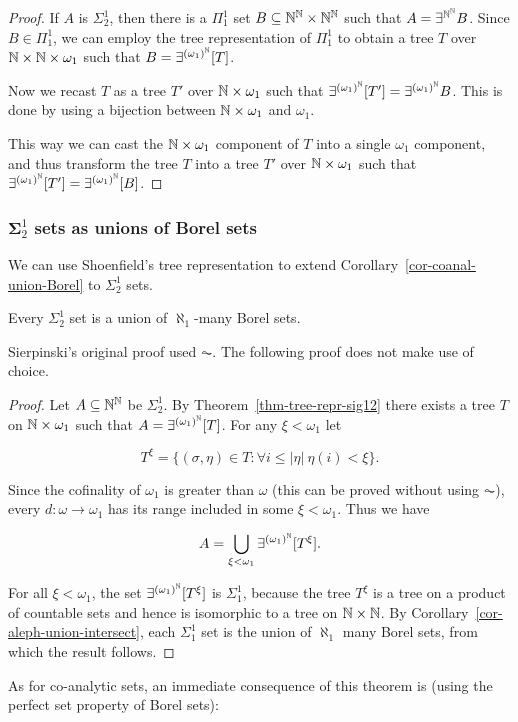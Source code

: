 \begin{proof}
If $A$ is $\Sigma^1_2$, then there is a $\Pi^1_1$ set $B \subseteq \mathbb{N}^{\mathbb{N}}\times\mathbb{N}^{\mathbb{N}}$  such that $A = \exists^{\mathbb{N}^{\mathbb{N}}} B$. Since $B \in \Pi^1_1$, we can employ the tree representation of $\Pi^1_1$ to obtain a tree $T$ over $\mathbb{N} \times \mathbb{N} \times \omega_1$ such that $B = \exists^{(\omega_1)^{\mathbb{N}}} [T]$.

Now we recast $T$ as a tree $T'$ over $\mathbb{N} \times \omega_1$ such that $\exists^{(\omega_1)^{\mathbb{N}}}[T'] = \exists^{(\omega_1)^{\mathbb{N}}} B$. This is done by using a bijection between $\mathbb{N} \times \omega_1$ and $\omega_1$.

This way we can cast the $\mathbb{N} \times \omega_1$ component of $T$ into a single $\omega_1$ component, and thus transform the tree $T$ into a tree $T'$ over $\mathbb{N} \times \omega_1$ such that $\exists^{(\omega_1)^{\mathbb{N}}}[T'] = \exists^{(\omega_1)^{\mathbb{N}}}[B]$.

\end{proof}\subsubsection{$\mathbf{\Sigma}^1_2$ sets as unions of Borel sets}

We can use Shoenfield's tree representation to extend Corollary~\ref{cor-coanal-union-Borel} to $\Sigma^1_2$ sets.

\begin{theorem}[Sierpinski, 1925]\label{thm-sigma12-union-borel}Every $\Sigma^1_2$ set is a union of $\aleph_1$-many Borel sets.

\end{theorem}Sierpinski's original proof used $\AC$. The following proof does not make use of choice.

\begin{proof}Let $A \subseteq \mathbb{N}^{\mathbb{N}}$ be $\Sigma^1_2$. By Theorem~\ref{thm-tree-repr-sig12} there exists a tree $T$ on $\mathbb{N} \times \omega_1$ such that $A = \exists^{(\omega_1)^{\mathbb{N}}}[T]$. For any $\xi < \omega_1$ let

\begin{equation}
T^\xi = \{ (\sigma,\eta) \in T\colon \forall i \leq |\eta|\:  \eta(i) < \xi \}.
\end{equation}

Since the cofinality of $\omega_1$ is greater than $\omega$ (this can be proved without using $\AC$), every $d: \omega \to \omega_1$ has its range included in some $\xi < \omega_1$. Thus we have

\begin{equation}
A = \bigcup_{\xi < \omega_1} \exists^{(\omega_1)^{\mathbb{N}}}[T^\xi].
\end{equation}

For all $\xi < \omega_1$, the set $\exists^{(\omega_1)^{\mathbb{N}}}[T^\xi]$ is $\Sigma^1_1$, because the tree $T^\xi$ is a tree on a product of countable sets and hence is isomorphic to a tree on $\mathbb{N} \times \mathbb{N}$. By Corollary~\ref{cor-aleph-union-intersect}, each $\Sigma^1_1$ set is the union of $\aleph_1$ many Borel sets, from which the result follows.

\end{proof}As for co-analytic sets, an immediate consequence of this theorem is (using the perfect set property of Borel sets):

